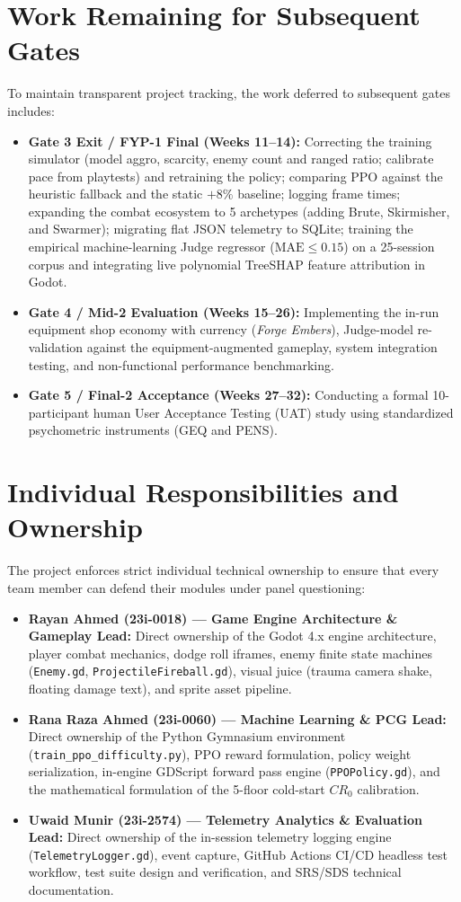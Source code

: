 \section{Work Remaining for Subsequent Gates}
To maintain transparent project tracking, the work deferred to subsequent gates includes:
\begin{itemize}
    \item \textbf{Gate 3 Exit / FYP-1 Final (Weeks 11--14):} Correcting the training simulator (model aggro, scarcity, enemy count and ranged ratio; calibrate pace from playtests) and retraining the policy; comparing PPO against the heuristic fallback and the static $+8\%$ baseline; logging frame times; expanding the combat ecosystem to 5 archetypes (adding Brute, Skirmisher, and Swarmer); migrating flat JSON telemetry to SQLite; training the empirical machine-learning Judge regressor ($\text{MAE} \le 0.15$) on a 25-session corpus and integrating live polynomial TreeSHAP feature attribution in Godot.
    \item \textbf{Gate 4 / Mid-2 Evaluation (Weeks 15--26):} Implementing the in-run equipment shop economy with currency (\textit{Forge Embers}), Judge-model re-validation against the equipment-augmented gameplay, system integration testing, and non-functional performance benchmarking.
    \item \textbf{Gate 5 / Final-2 Acceptance (Weeks 27--32):} Conducting a formal 10-participant human User Acceptance Testing (UAT) study using standardized psychometric instruments (GEQ and PENS).
\end{itemize}

\section{Individual Responsibilities and Ownership}\label{sec:ownership}
The project enforces strict individual technical ownership to ensure that every team member can defend their modules under panel questioning:
\begin{itemize}
    \item \textbf{Rayan Ahmed (23i-0018) — Game Engine Architecture \& Gameplay Lead:} Direct ownership of the Godot 4.x engine architecture, player combat mechanics, dodge roll iframes, enemy finite state machines (\texttt{Enemy.gd}, \texttt{ProjectileFireball.gd}), visual juice (trauma camera shake, floating damage text), and sprite asset pipeline.
    \item \textbf{Rana Raza Ahmed (23i-0060) — Machine Learning \& PCG Lead:} Direct ownership of the Python Gymnasium environment (\texttt{train\_ppo\_difficulty.py}), PPO reward formulation, policy weight serialization, in-engine GDScript forward pass engine (\texttt{PPOPolicy.gd}), and the mathematical formulation of the 5-floor cold-start $CR_0$ calibration.
    \item \textbf{Uwaid Munir (23i-2574) — Telemetry Analytics \& Evaluation Lead:} Direct ownership of the in-session telemetry logging engine (\texttt{TelemetryLogger.gd}), event capture, GitHub Actions CI/CD headless test workflow, test suite design and verification, and SRS/SDS technical documentation.
\end{itemize}

